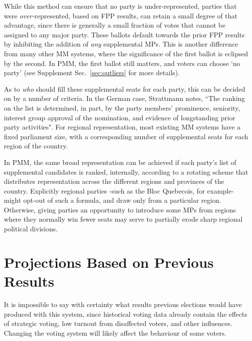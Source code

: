 While this method can ensure that no party is under-represented, parties that were \emph{over-}represented, based on FPP results, can retain a small degree of that advantage, since there is generally a small fraction of votes that cannot be assigned to any major party. These ballots default towards the prior FPP results by inhibiting the addition of \emph{any} supplemental MPs.
This is another difference from many other MM systems, where the significance of the first ballot is eclipsed by the second. In PMM, the first ballot still matters, and voters can choose `no party' (see Supplement Sec.~\ref{sec:outliers} for more details).

As to \emph{who} should fill these supplemental seats for each party, this can be decided on by a number of criteria.
In the German case, Strattmann notes\cite{Stratmann}, ``The ranking on the list is determined, in part, by the party members' prominence, seniority, interest group approval of the nomination, and evidence of longstanding prior party activities".
For regional representation, most existing MM systems have a fixed parliament size, with a corresponding number of supplemental seats for each region of the country.

In PMM, the same broad representation can be achieved if each party's list of supplemental candidates is ranked, internally, according to a rotating scheme that distributes representation across the different regions and provinces of the country.
Explicitly regional parties \--such as the Bloc Quebecois, for example\-- might opt-out of such a formula, and draw only from a particular region.
Otherwise, giving parties an opportunity to introduce some MPs from regions where they normally win fewer seats may serve to partially erode sharp regional political divisions.


\section{Projections Based on Previous Results}
\label{sec:projections}

It is impossible to say with certainty what results previous elections would have produced with this system, since historical voting data already contain the effects of strategic voting, low turnout from disaffected voters, and other influences. Changing the voting system will likely affect the behaviour of some voters.

